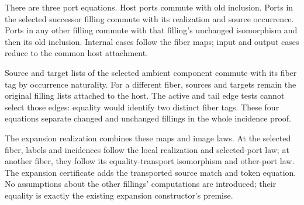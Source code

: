 


There are three port equations. Host ports commute with old inclusion.
Ports in the selected successor filling commute with its realization and
source occurrence. Ports in any other filling commute with that filling's
unchanged isomorphism and then its old inclusion. Internal cases follow the
fiber maps; input and output cases reduce to the common host attachment.




Source and target lists of the selected ambient component commute with its
fiber tag by occurrence naturality. For a different fiber, sources and targets
remain the original filling lists attached to the host. The active and tail
edge tests cannot select those edges: equality would identify two distinct
fiber tags. These four equations separate changed and unchanged fillings in
the whole incidence proof.





The expansion realization combines these maps and image laws. At the selected
fiber, labels and incidences follow the local realization and selected-port
law; at another fiber, they follow its equality-transport isomorphism and
other-port law. The expansion certificate adds the transported source match
and token equation. No assumptions about the other fillings' computations
are introduced; their equality is exactly the existing expansion constructor's
premise.

